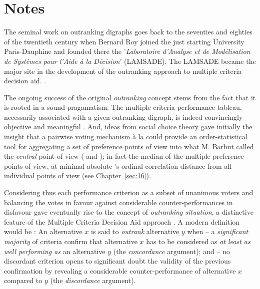 {}
\section*{Notes}

The seminal work on outranking digraphs goes back to the seventies and eighties of the twentieth century when Bernard Roy  joined the just starting University Paris-Dauphine and founded there the '\emph{Laboratoire d’Analyse et de Modélisation de Systèmes pour l’Aide à la Décision}' (LAMSADE). The LAMSADE became the major site in the development of the outranking approach to multiple criteria decision aid. \citep*{ROY-1993}.

The ongoing success of the original \emph{outranking} concept stems from the fact that it is rooted in a sound pragamatism. The multiple criteria performance tableau, necessarily associated with a given outranking digraph, is indeed convincingly objective and meaningful \citep{ROY-1991}. And, ideas from social choice theory gave initially the insight that a pairwise voting mechanism à la \Condorcet could provide an order-statistical tool for aggregating a set of preference points of view into what M. Barbut called the \emph{central} \Condorcet point of view (\citet{CON-1784} and \citet{BAR-1980}); in fact the median of the multiple preference points of view, at minimal absolute \Kendall's ordinal correlation distance from all individual points of view (see Chapter~\ref{sec:16}).

Considering thus each performance criterion as a subset of unanimous voters and balancing the votes in favour against considerable counter-performances in disfavour gave eventually rise to the concept of \emph{outranking situation}, a distinctive feature of the Multiple Criteria Decision Aid approach \citep{BIS-2015}.  A modern definition would be : An alternative $x$ is said to \emph{outrank} alternative $y$ when – a \emph{significant majority} of criteria confirm that alternative $x$ has to be considered as \emph{at least as well performing as} an alternative $y$ (the \emph{concordance} argument); and – no discordant criterion opens to significant doubt the validity of the previous confirmation by revealing a considerable counter-performance of alternative $x$ compared to $y$ (the \emph{discordance} argument).

